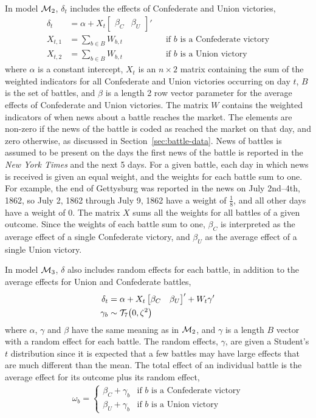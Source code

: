 In model $\mathcal{M}_{\text{2}}$, $\delta_{t}$  includes the effects of Confederate and Union victories,
\begin{align}
  \label{bonds:eq:2}
  \delta_{t} &= \alpha + X_{t} \begin{bmatrix}\beta_{C} & \beta_{U}\end{bmatrix}'  \\
  X_{t, 1} &= \sum_{b \in B} W_{b,t} && \text{if $b$ is a Confederate victory} \\
  X_{t, 2} &= \sum_{b \in B} W_{b,t} && \text{if $b$ is a Union victory}
\end{align}
where $\alpha$ is a constant intercept, $X_{t}$ is an $n \times 2$ matrix containing the sum of the weighted indicators for all Confederate and Union victories occurring on day $t$, $B$ is the set of battles, and $\beta$ is a length 2 row vector parameter for the average effects of Confederate and Union victories.
The matrix $W$ contains the weighted indicators of when news about a battle reaches the market.
The elements are non-zero if the news of the battle is coded as reached the market on that day, and zero otherwise, as discussed in Section~\ref{sec:battle-data}.
News of battles is assumed to be present on the days the first news of the battle is reported in the \textit{New York Times} and the next 5 days.
For a given battle, each day in which news is received is given an equal weight, and the weights for each battle sum to one.
For example, the end of Gettysburg was reported in the news on July 2nd--4th, 1862, so July 2, 1862 through July 9, 1862 have a weight of $\frac{1}{8}$, and all other days have a weight of 0.
The matrix $X$ sums all the weights for all battles of a given outcome.
Since the weights of each battle sum to one, $\beta_{C}$ is interpreted as the average effect of a single Confederate victory, and $\beta_{U}$ as the average effect of a single Union victory.

In model $\mathcal{M}_{\text{3}}$, $\delta$ also includes random effects for each battle, in addition to the average effects for Union and Confederate battles,
\begin{align}
  \label{bonds:eq:10}
  \delta_{t} &= \alpha + X_{t} \begin{bmatrix}\beta_{C} & \beta_{U}\end{bmatrix}' + W_{t} \gamma' \\
  \label{bonds:eq:12}
  \gamma_{b} &\sim \mathcal{T}_{7}\mathopen{}\left(0, \zeta^{2}\right)\mathclose{}
\end{align}
where $\alpha$, $\gamma$ and $\beta$ have the same meaning as in $\mathcal{M}_{\text{2}}$, and $\gamma$ is a length $B$ vector with a random effect for each battle.
The random effects, $\gamma$, are given a Student's $t$ distribution since it is expected that a few battles may have large effects that are much different than the mean.
The total effect of an individual battle is the average effect for its outcome plus its random effect,
\begin{align}
  \omega_{b} =
  \begin{cases}
    \beta_{C} + \gamma_{b} & \text{if $b$ is a Confederate victory} \\
    \beta_{U} + \gamma_{b} & \text{if $b$ is a Union victory}
  \end{cases}
\end{align}

